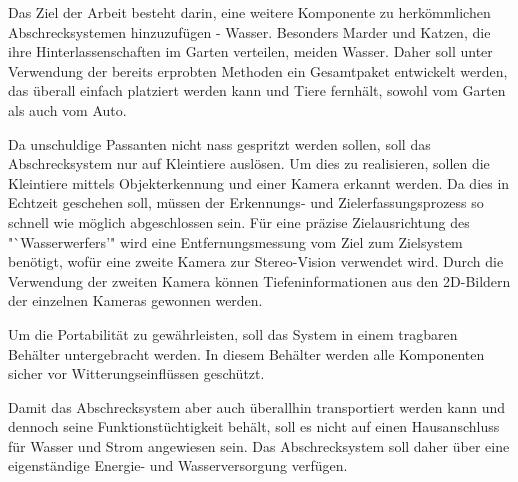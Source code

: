 

Das Ziel der Arbeit besteht darin, eine weitere Komponente zu herkömmlichen Abschrecksystemen hinzuzufügen - Wasser. Besonders Marder und Katzen, die ihre Hinterlassenschaften im Garten verteilen, meiden Wasser. Daher soll unter Verwendung der bereits erprobten Methoden ein Gesamtpaket entwickelt werden, das überall einfach platziert werden kann und Tiere fernhält, sowohl vom Garten als auch vom Auto.

Da unschuldige Passanten nicht nass gespritzt werden sollen, soll das Abschrecksystem nur auf Kleintiere auslösen. Um dies zu realisieren, sollen die Kleintiere mittels Objekterkennung und einer Kamera erkannt werden. Da dies in Echtzeit geschehen soll, müssen der Erkennungs- und Zielerfassungsprozess so schnell wie möglich abgeschlossen sein. Für eine präzise Zielausrichtung des "`Wasserwerfers'" wird eine Entfernungsmessung vom Ziel zum Zielsystem benötigt, wofür eine zweite Kamera zur Stereo-Vision verwendet wird. Durch die Verwendung der zweiten Kamera können Tiefeninformationen aus den 2D-Bildern der einzelnen Kameras gewonnen werden.

Um die Portabilität zu gewährleisten, soll das System in einem tragbaren Behälter untergebracht werden. In diesem Behälter werden alle Komponenten sicher vor Witterungseinflüssen geschützt.

Damit das Abschrecksystem aber auch überallhin transportiert werden kann und dennoch seine Funktionstüchtigkeit behält, soll es nicht auf einen Hausanschluss für Wasser und Strom angewiesen sein. Das Abschrecksystem soll daher über eine eigenständige Energie- und Wasserversorgung verfügen.


